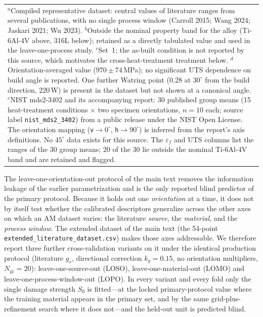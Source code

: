 \documentclass[12pt,a4paper,twocolumn]{article}
\providecommand{\ang}[1]{\ensuremath{#1^{\circ}}}
\begin{document}
\begin{table}[htbp]
\begin{tabular}{p{}p{}p{}cp{}p{}p{}}
\bottomrule
\multicolumn{7}{p{0.97\textwidth}}{\footnotesize $^{a}$Compiled representative dataset: central values of
literature ranges from several publications, with no single process window (Carroll 2015; Wang 2024;
Jaskari 2021; Wu 2023). $^{b}$Outside the nominal property band for the alloy (Ti-6Al-4V above, 316L
below); retained as a directly tabulated value and used in the leave-one-process study. $^{c}$Set~1; the
as-built condition is not reported by this source, which motivates the cross-heat-treatment treatment
below. $^{d}$Orientation-averaged value ($970\pm74$\,MPa); no significant UTS dependence on build angle
is reported. One further Watring point (0.28 at $30^\circ$ from the build direction, 220\,W) is present in
the dataset but not shown at a canonical angle. $^{e}$NIST mds2-3402 and its accompanying report: 30
published group means (15 heat-treatment conditions $\times$ two specimen orientations, $n=10$ each; source
label \texttt{nist\_mds2\_3402}) from a public release under the NIST Open License. The orientation mapping
(\texttt{v}$\rightarrow\ang{0}$, \texttt{h}$\rightarrow\ang{90}$) is inferred from the report's axis
definitions. No $\ang{45}$ data exists for this source. The $\varepsilon_f$ and UTS columns list the ranges
of the 30 group means; 20 of the 30 lie outside the nominal Ti-6Al-4V band and are retained and flagged.}
\end{tabular}
\end{table}

The leave-one-orientation-out protocol of the main text removes the information leakage of the
earlier parametrization and is the only reported blind predictor of the primary protocol. Because it
holds out one \emph{orientation} at a time, it does not by itself test whether the calibrated descriptors
generalize across the other axes on which an AM dataset varies: the literature \emph{source}, the
\emph{material}, and the \emph{process window}. The extended dataset of the main text (the 54-point
\texttt{extended\_literature\_dataset.csv}) makes those axes addressable. We therefore report three
further cross-validation variants on it under the identical production protocol (literature $g_s$,
directional correction $k_g = 0.15$, no orientation multipliers, $N_{\mathrm{gr}} = 20$): leave-one-source-out
(LOSO), leave-one-material-out (LOMO) and leave-one-process-window-out (LOPO). In every variant and every
fold only the single damage strength $S_0$ is fitted---at the locked primary-protocol value where the
training material appears in the primary set, and by the same grid-plus-refinement search where it does
not---and the held-out unit is predicted blind.
\end{document}
